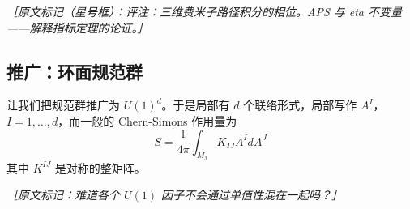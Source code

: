 {\small\itshape ［原文标记（星号框）：评注：三维费米子路径积分的相位。APS 与 eta 不变量——解释指标定理的论证。］}

\subsection{推广：环面规范群} %

让我们把规范群推广为 $U(1)^d$。于是局部有 $d$ 个联络形式，局部写作 $A^I$，$I=1,\dots,d$，而一般的 Chern-Simons 作用量为
\begin{equation}
  S=\frac{1}{4\pi}\int_{M_3}K_{IJ}A^IdA^J
  \tag{2.357}
  \label{eq:2.357}
\end{equation}
其中 $K^{IJ}$ 是对称的整矩阵。

{\small\itshape ［原文标记：难道各个 $U(1)$ 因子不会通过单值性混在一起吗？］}

